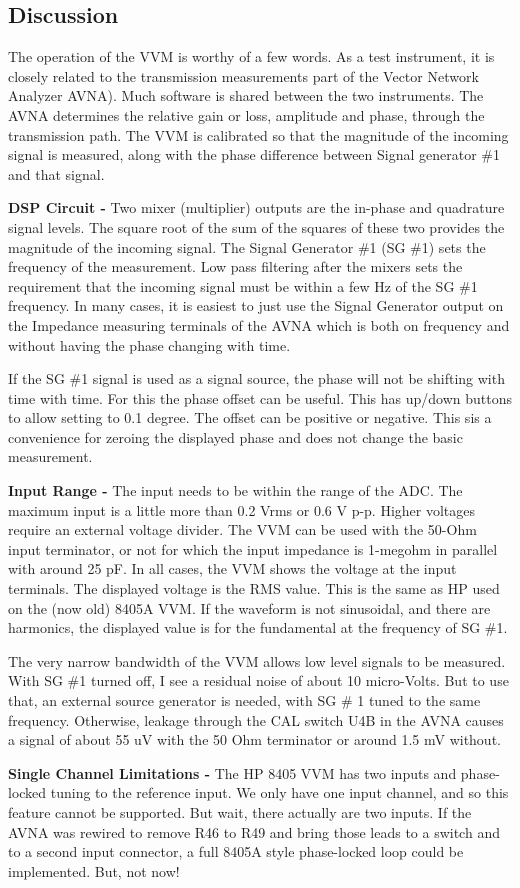 \subsection{Discussion}
\label{subsect:VVMDiscus}
The operation of the VVM is worthy of a few words. As a test instrument, it is closely related to the transmission measurements part of the Vector Network Analyzer AVNA). Much software is shared between the two instruments. The AVNA determines the relative gain or loss, amplitude and phase, through the transmission path. The VVM is calibrated so that the magnitude of the incoming signal is measured, along with the phase difference between Signal generator \#1 and that signal.

\textbf{DSP Circuit - }Two mixer (multiplier) outputs are the in-phase and quadrature signal levels. The square root of the sum of the squares of these two provides the magnitude of the incoming signal. The Signal Generator \#1 (SG \#1) sets the frequency of the measurement. Low pass filtering after the mixers sets the requirement that the incoming signal must be within a few Hz of the SG \#1 frequency. In many cases, it is easiest to just use the Signal Generator output on the Impedance measuring terminals of the AVNA which is both on frequency and without having the phase changing with time.

If the SG \#1 signal is used as a signal source, the phase will not be shifting with time with time. For this the phase offset can be useful. This has up/down buttons to allow setting to 0.1 degree. The offset can be positive or negative. This sis a convenience for zeroing the displayed phase and does not change the basic measurement.

\textbf{Input Range - }The input needs to be within the range of the ADC. The maximum input is a little more than 0.2 Vrms or 0.6 V p-p.  Higher voltages require an external voltage divider.  The VVM can be used with the 50-Ohm input terminator, or not for which the input impedance is 1-megohm in parallel with around 25 pF.  In all cases, the VVM shows the voltage at the input terminals.  The displayed voltage is the RMS value.  This is the same as HP used on the (now  old) 8405A VVM.   If the waveform is not sinusoidal, and there are harmonics, the displayed value is for the fundamental at the frequency of SG \#1.

The very narrow bandwidth of the VVM allows low level signals to be measured.  With SG \#1 turned off, I see a residual noise of about 10 micro-Volts.  But to use that, an external source generator is needed, with SG \# 1 tuned to the same frequency.  Otherwise, leakage through the CAL switch U4B in the AVNA causes a signal of about 55 uV with the 50 Ohm terminator or around 1.5 mV without.

\textbf{Single Channel Limitations - }The HP 8405 VVM has two inputs and phase-locked tuning to the reference input.  We only have one input channel, and so this feature cannot be supported.  But wait, there actually are two inputs.  If the AVNA was rewired to remove R46 to R49 and bring those leads to a switch and to a second input connector, a full 8405A style phase-locked loop could be implemented.  But, not now!

